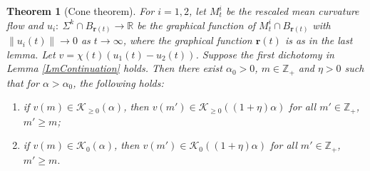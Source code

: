 \documentclass[11pt]{amsart}
\numberwithin{equation}{section}
\newtheorem{theorem}{Theorem}[section]
\numberwithin{equation}{section}
\newcommand{\br}{\mathbf{r}}
\newcommand{\cK}{\mathcal{K}}
\newcommand{\R}{\mathbb{R}}
\begin{document}
	\begin{theorem}[Cone theorem]\label{ThmCone}
		For $i=1,2$, let $M_t^i$ be the rescaled mean curvature flow and $u_i:\ \Sigma^k\cap B_{\br(t)}\to \R$ be the graphical function of $M^i_t\cap B_{\br(t)}$ with $\|u_i(t)\|\to 0$ as $t\to\infty$, where the graphical function $\br(t)$ is as in the last lemma. Let $v=\chi(t)(u_1(t)-u_2(t))$. Suppose the first dichotomy in Lemma \ref{LmContinuation} holds. Then there exist $\alpha_0>0$, $m\in\mathbb Z_+$ and $\eta>0$ such that for $\alpha>\alpha_0$, the following holds:
		\begin{enumerate}
			\item if $v(m)\in \cK_{\geq 0}(\alpha)$, then $v(m')\in \cK_{\geq 0}((1+\eta)\alpha)$ for all $m'\in\mathbb Z_+$, $m'\ge m$;
			\item if $v(m)\in \cK_{0}(\alpha)$, then $v(m')\in \cK_{0}((1+\eta)\alpha)$ for all $m'\in\mathbb Z_+$, $m'\geq m. $
		\end{enumerate}
	\end{theorem}
	
\end{document}
